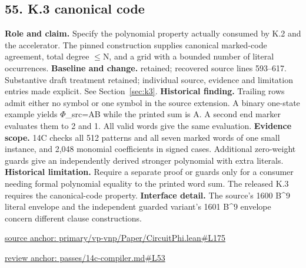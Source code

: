 \documentclass[11pt,letterpaper]{article}
\theoremstyle{definition}\newtheorem{definition}[theorem]{Definition}\newtheorem{example}[theorem]{Example}
\theoremstyle{remark}\newtheorem{remark}[theorem]{Remark}
\begin{document}
\subsection*{55. K.3 canonical code}
\textbf{Role and claim.} Specify the polynomial property actually consumed by K.2 and the accelerator. The pinned construction supplies canonical marked-code agreement, total degree \ensuremath{\le}N, and a grid with a bounded number of literal occurrences.
\textbf{Baseline and change.} retained; recovered source lines 593--617. Substantive draft treatment retained; individual source, evidence and limitation entries made explicit. See Section~\ref{sec:k3}.
\textbf{Historical finding.} Trailing rows admit either no symbol or one symbol in the source extension. A binary one-state example yields \ensuremath{\Phi}\_src=AB while the printed sum is A. A second end marker evaluates them to 2 and 1. All valid words give the same evaluation.
\textbf{Evidence scope.} 14C checks all 512 patterns and all seven marked words of one small instance, and 2,048 monomial coefficients in signed cases. Additional zero-weight guards give an independently derived stronger polynomial with extra literals.
\textbf{Historical limitation.} Require a separate proof or guards only for a consumer needing formal polynomial equality to the printed word sum. The released K.3 requires the canonical-code property.
\textbf{Interface detail.} The source's 1600 B\textasciicircum{}9 literal envelope and the independent guarded variant's 1601 B\textasciicircum{}9 envelope concern different clause constructions.
\par\href{https://github.com/nousentllc/VP-VNP-Review/blob/8a7976933b6b2b4ffda1ad3a0dfb5fc6b6f023e8/primary/vp-vnp/Paper/CircuitPhi.lean\#L175}{source anchor: primary/vp-vnp/Paper/CircuitPhi.lean\#L175}
\par\href{https://github.com/nousentllc/VP-VNP-Review/blob/8a7976933b6b2b4ffda1ad3a0dfb5fc6b6f023e8/passes/14c-compiler.md\#L53}{review anchor: passes/14c-compiler.md\#L53}
\goodbreak
\end{document}
